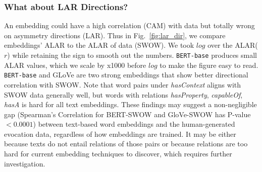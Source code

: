 \documentclass[letterpaper]{article} %
\begin{document}
\subsubsection{What about LAR Directions?} An embedding could have a high correlation (CAM) with data but totally wrong on asymmetry directions (LAR). Thus in Fig.~\ref{fig:lar_dir}, we compare embeddings' ALAR to the ALAR of data (SWOW). We took $log$ over the ALAR($r$) while retaining the sign to smooth out the numbers. \texttt{BERT-base} produces small ALAR values, which we scale by x1000 before $log$ to make the figure easy to read. \texttt{BERT-base} and GLoVe are two strong embeddings that show better directional correlation with SWOW. Note that word pairs under \textit{hasContext} aligns with SWOW data generally well, but words with relations \textit{hasProperty}, \textit{capableOf}, \textit{hasA} is hard for all text embeddings. These findings may suggest a non-negligible gap (Spearman's Correlation for BERT-SWOW and GloVe-SWOW has P-value$<0.0001$) between text-based word embeddings and the human-generated evocation data, regardless of how embeddings are trained. It may be either because texts do not entail relations of those pairs or because relations are too hard for current embedding techniques to discover, which requires further investigation. 
\end{document}
